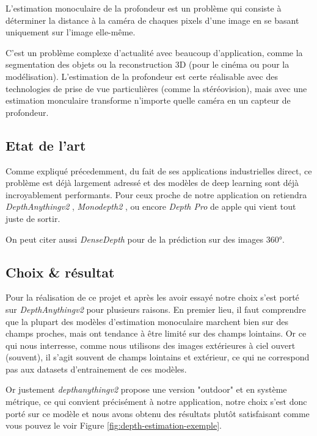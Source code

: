 
L'estimation monoculaire de la profondeur est un problème qui consiste à déterminer la distance à la caméra de chaques pixels d'une image en se basant uniquement sur l'image elle-même.

C'est un problème complexe d'actualité avec beaucoup d'application, comme la segmentation des objets ou la reconstruction 3D (pour le cinéma ou pour la modélisation). L'estimation de la profondeur est certe réalisable avec des technologies de prise de vue particulières (comme la stéréovision), mais avec une estimation monculaire transforme n'importe quelle caméra en un capteur de profondeur.

\subsection{Etat de l'art}

Comme expliqué précedemment, du fait de ses applications industrielles direct, ce problème est déjà largement adressé et des modèles de deep learning sont déjà incroyablement performants. Pour ceux proche de notre application on retiendra \textit{DepthAnythingv2} \cite{depthanythingv2}, \textit{Monodepth2} \cite{MonoDepth2}, ou encore \textit{Depth Pro} \cite{depthpro} de apple qui vient tout juste de sortir.

On peut citer aussi \textit{DenseDepth} \cite{DenseDepth} pour de la prédiction sur des images 360°.

\subsection{Choix \& résultat}

Pour la réalisation de ce projet et après les avoir essayé notre choix s'est porté sur \textit{DepthAnythingv2} pour plusieurs raisons. En premier lieu, il faut comprendre que la plupart des modèles d'estimation monoculaire marchent bien sur des champs proches, mais ont tendance à être limité sur des champs lointains. Or ce qui nous interresse, comme nous utilisons des images extérieures à ciel ouvert (souvent), il s'agit souvent de champs lointains et extérieur, ce qui ne correspond pas aux datasets d'entrainement de ces modèles. 

Or justement \textit{depthanythingv2} propose une version "outdoor" et en système métrique, ce qui convient précisément à notre application, notre choix s'est donc porté sur ce modèle et nous avons obtenu des résultats plutôt satisfaisant comme vous pouvez le voir Figure \ref{fig:depth-estimation-exemple}.

